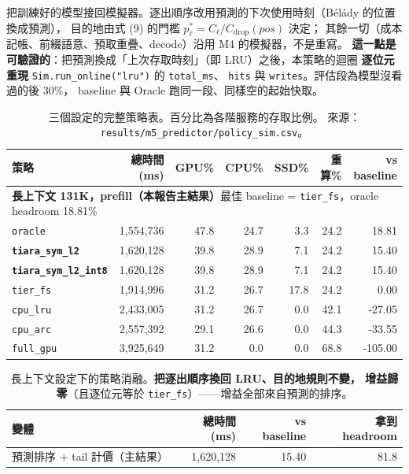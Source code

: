 \documentclass[11pt]{article}
\newcommand{\key}[1]{\textcolor{hlcol}{\textbf{#1}}}
\begin{document}
把訓練好的模型接回模擬器。逐出順序改用預測的下次使用時刻（Bélády 的位置換成預測），
目的地由式 (9) 的門檻 $p^{*}_{\ell}=C_{\ell}/C_{\mathrm{drop}}(pos)$ 決定；
其餘一切（成本記帳、前綴語意、預取重疊、decode）沿用 M4 的模擬器，不是重寫。
\key{這一點是可驗證的}：把預測換成「上次存取時刻」（即 LRU）之後，本策略的迴圈
\textbf{逐位元重現} \texttt{Sim.run\_online("lru")} 的 \texttt{total\_ms}、
\texttt{hits} 與 \texttt{writes}。評估段為模型沒看過的後 30\%，
baseline 與 Oracle 跑同一段、同樣空的起始快取。

\begin{table}[htbp]\centering\small
\caption{三個設定的完整策略表。百分比為各階服務的存取比例。
來源：\texttt{results/m5\_predictor/policy\_sim.csv}。}
\begin{tabular}{lrrrrrr}
\toprule
策略 & 總時間 (ms) & GPU\% & CPU\% & SSD\% & 重算\% & vs baseline \\
\midrule
\multicolumn{7}{l}{\textbf{長上下文 131K，prefill（本報告主結果）}\quad\small 最佳 baseline = \texttt{tier\_fs}，oracle headroom 18.81\%} \\
\quad \texttt{oracle} & 1,554,736 & 47.8 & 24.7 & 3.3 & 24.2 & 18.81 \\
\quad \texttt{\textbf{tiara\_sym\_l2}} & 1,620,128 & 39.8 & 28.9 & 7.1 & 24.2 & 15.40 \\
\quad \texttt{\textbf{tiara\_sym\_l2\_int8}} & 1,620,128 & 39.8 & 28.9 & 7.1 & 24.2 & 15.40 \\
\quad \texttt{tier\_fs} & 1,914,996 & 31.2 & 26.7 & 17.8 & 24.2 & 0.00 \\
\quad \texttt{cpu\_lru} & 2,433,005 & 31.2 & 26.7 & 0.0 & 42.1 & -27.05 \\
\quad \texttt{cpu\_arc} & 2,557,392 & 29.1 & 26.6 & 0.0 & 44.3 & -33.55 \\
\quad \texttt{full\_gpu} & 3,925,649 & 31.2 & 0.0 & 0.0 & 68.8 & -105.00 \\
\bottomrule
\end{tabular}
\end{table}

\begin{table}[htbp]\centering\small
\caption{長上下文設定下的策略消融。\key{把逐出順序換回 LRU、目的地規則不變，
增益歸零}（且逐位元等於 \texttt{tier\_fs}）——增益全部來自預測的排序。}
\begin{tabular}{lrrr}
\toprule
變體 & 總時間 (ms) & vs baseline & 拿到 headroom \\
\midrule
預測排序 + tail 計價（主結果） & 1,620,128 & 15.40 & 81.8 \\
\bottomrule
\end{tabular}
\end{table}
\end{document}
